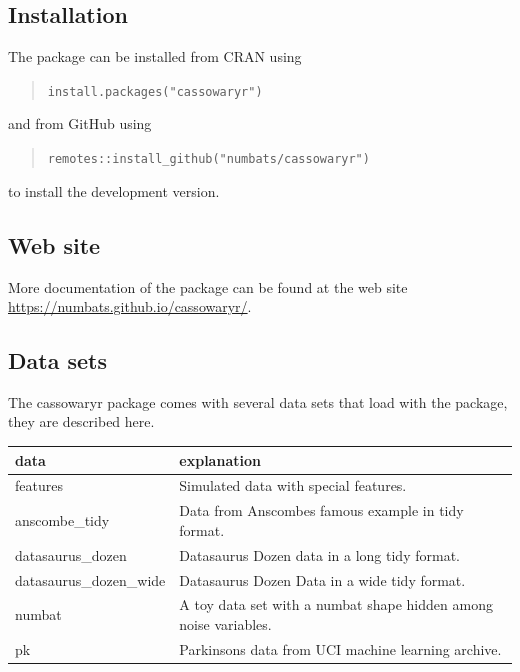 \hypertarget{installation}{%
\subsection{Installation}\label{installation}}

The package can be installed from CRAN using

\begin{quote}
\texttt{install.packages("cassowaryr")}
\end{quote}

and from GitHub using

\begin{quote}
\texttt{remotes::install\_github("numbats/cassowaryr")}
\end{quote}

to install the development version.

\hypertarget{web-site}{%
\subsection{Web site}\label{web-site}}

More documentation of the package can be found at the web site
\url{https://numbats.github.io/cassowaryr/}.

\hypertarget{data-sets}{%
\subsection{Data sets}\label{data-sets}}

The cassowaryr package comes with several data sets that load with the
package, they are described here.

\begin{Schunk}

\begin{tabular}{l|l}
\hline
data & explanation\\
\hline
features & Simulated data with special features.\\
\hline
anscombe\_tidy & Data from Anscombes famous example in tidy format.\\
\hline
datasaurus\_dozen & Datasaurus Dozen data in a long tidy format.\\
\hline
datasaurus\_dozen\_wide & Datasaurus Dozen Data in a wide tidy format.\\
\hline
numbat & A toy data set with a numbat shape hidden among noise variables.\\
\hline
pk & Parkinsons data from UCI machine learning archive.\\
\hline
\end{tabular}

\end{Schunk}


